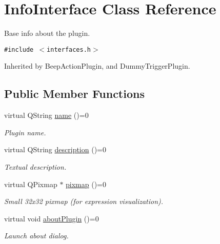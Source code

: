 \hypertarget{class_info_interface}{
\section{InfoInterface Class Reference}
\label{class_info_interface}
}
Base info about the plugin.  


{\tt \#include $<$interfaces.h$>$}

Inherited by BeepActionPlugin, and DummyTriggerPlugin.

\subsection*{Public Member Functions}
\begin{CompactItemize}
\item 
\hypertarget{class_info_interface_b3e629d9490bfb1d3a2703712e53823f}{
virtual QString \hyperlink{class_info_interface_b3e629d9490bfb1d3a2703712e53823f}{name} ()=0}
\label{class_info_interface_b3e629d9490bfb1d3a2703712e53823f}

\begin{CompactList}\small\item\em Plugin name. \item\end{CompactList}\item 
\hypertarget{class_info_interface_31671f8b25c12c9a53e222653ae4f75b}{
virtual QString \hyperlink{class_info_interface_31671f8b25c12c9a53e222653ae4f75b}{description} ()=0}
\label{class_info_interface_31671f8b25c12c9a53e222653ae4f75b}

\begin{CompactList}\small\item\em Textual description. \item\end{CompactList}\item 
\hypertarget{class_info_interface_0d2410f50fb1628722fa410d38f3b8a2}{
virtual QPixmap $\ast$ \hyperlink{class_info_interface_0d2410f50fb1628722fa410d38f3b8a2}{pixmap} ()=0}
\label{class_info_interface_0d2410f50fb1628722fa410d38f3b8a2}

\begin{CompactList}\small\item\em Small 32x32 pixmap (for expression visualization). \item\end{CompactList}\item 
\hypertarget{class_info_interface_07dd11e800c1af741a6cc6db510f79d9}{
virtual void \hyperlink{class_info_interface_07dd11e800c1af741a6cc6db510f79d9}{aboutPlugin} ()=0}
\label{class_info_interface_07dd11e800c1af741a6cc6db510f79d9}

\begin{CompactList}\small\item\em Launch about dialog. \item\end{CompactList}\end{CompactItemize}


